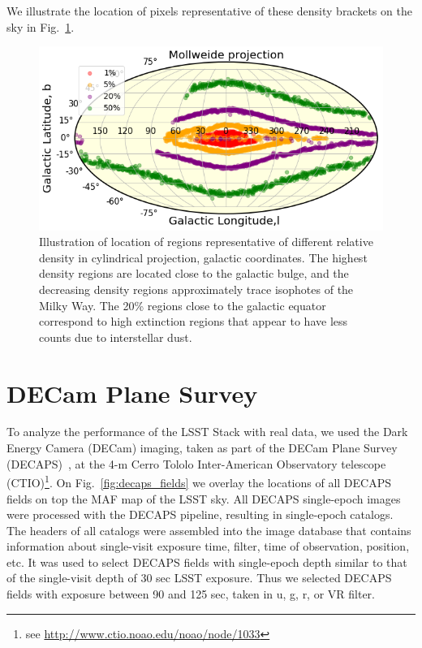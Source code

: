 \documentclass[DM,lsstdraft,toc,usenatbib]{lsstdoc}
\begin{document}
We illustrate the location of pixels representative of these density brackets on the sky in Fig.~\ref{fig:mollw_galactic}. 


\begin{figure}
\includegraphics[width=1.0\columnwidth]{figs/03_density_regions_mollw_galactic.png}
\caption{Illustration of location of regions representative of different relative density in cylindrical projection, galactic coordinates. The highest density regions are located close to the galactic bulge, and the decreasing density regions approximately trace isophotes of the Milky Way. The 20\% regions close to the galactic equator correspond to high extinction regions that appear to have less counts due to interstellar dust. }
\label{fig:mollw_galactic}
\end{figure} 


\section{DECam Plane Survey }
\label{sec:DECAPS}
To analyze the performance of the LSST Stack with real data, we used the Dark Energy Camera (DECam) imaging, taken as part of the  DECam Plane Survey (DECAPS)~\cite{schlafly2017}, at the 4-m Cerro Tololo Inter-American Observatory telescope (CTIO)\footnote{see \url{http://www.ctio.noao.edu/noao/node/1033}}. On Fig.~\ref{fig:decaps_fields} we overlay the locations of all DECAPS fields on top  the MAF map of the LSST sky. All DECAPS single-epoch images were processed with the DECAPS pipeline, resulting in single-epoch catalogs.  The headers of all catalogs were assembled into the image database that contains information about single-visit exposure time, filter,  time of observation, position, etc.  It was used to select DECAPS fields with single-epoch depth similar to that of the single-visit depth of 30 sec LSST exposure. Thus we selected DECAPS fields with  exposure between 90  and 125 sec, taken in   u, g, r,  or VR filter. 
\end{document}
